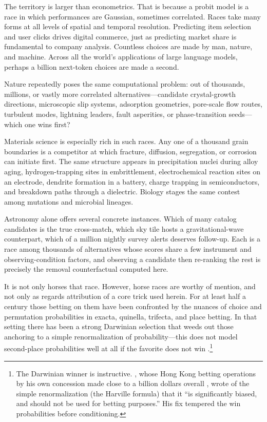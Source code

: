 \documentclass[12pt]{article}
\theoremstyle{remark}
\begin{document}
The territory is larger than econometrics. That is because a probit model is a race in which performances
are Gaussian, sometimes correlated. Races take many forms at all levels of spatial and temporal resolution. Predicting item selection and user clicks drives digital commerce, just as 
predicting market share is fundamental to company analysis. Countless choices are made by man, nature, and machine. Across all the world's applications
of large language models, perhaps a billion next-token choices are made a second.

Nature repeatedly poses the same computational problem: out of thousands, millions, or vastly more correlated alternatives---candidate crystal-growth directions, microscopic slip systems, adsorption geometries, pore-scale flow routes, turbulent modes, lightning leaders, fault asperities, or phase-transition seeds---which one wins first?

Materials science is especially rich in such races. Any one of a
thousand grain boundaries is a competitor at which fracture, diffusion,
segregation, or corrosion can initiate first. The same structure
appears in precipitation nuclei during alloy aging, hydrogen-trapping
sites in embrittlement, electrochemical reaction sites on an electrode,
dendrite formation in a battery, charge trapping in semiconductors, and
breakdown paths through a dielectric. Biology stages the same contest
among mutations and microbial lineages.

Astronomy alone offers several concrete instances. Which of many
catalog candidates is the true cross-match, which sky tile hosts a
gravitational-wave counterpart, which of a million nightly survey
alerts deserves follow-up. Each is a race among thousands of
alternatives whose scores share a few instrument and observing-condition
factors, and observing a candidate then re-ranking the rest is
precisely the removal counterfactual computed here.

It is not only horses that race. However, horse races are worthy of mention, and not only as regards attribution of a core trick used herein. For at least half a century those betting on them have been confronted by the nuances of choice and permutation probabilities in exacta, quinella, trifecta, and place betting. In that setting there has been a strong Darwinian selection that weeds out those anchoring to a simple renormalization of probability---this does not model second-place probabilities well at all if the favorite does not win \citep{henery1981,lo1994}.\footnote{The
Darwinian winner is instructive. \citet{benter1994}, whose Hong Kong
betting operations by his own concession made close to a billion
dollars overall \citep{chellel2018}, wrote of the simple
renormalization (the Harville formula) that it ``is significantly
biased, and should not be used for betting purposes.'' His fix
tempered the win probabilities before conditioning.}
\end{document}
